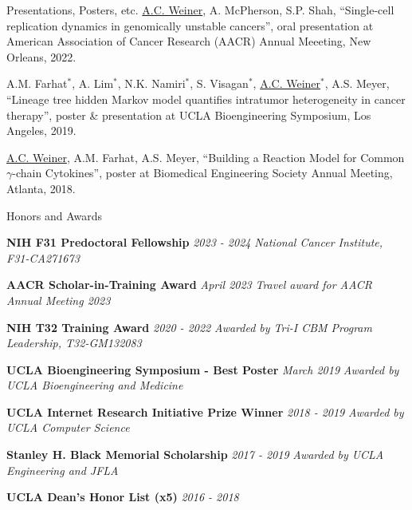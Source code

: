 \documentclass{resume} %
\begin{document}
\begin{rSection}{Presentations, Posters, etc.}
\underline{A.C. Weiner}, A. McPherson, S.P. Shah, ``Single-cell replication dynamics in genomically unstable cancers'', oral presentation at American Association of Cancer Research (AACR) Annual Meeeting, New Orleans, 2022.

A.M. Farhat$^{\ast}$, A. Lim$^{\ast}$, N.K. Namiri$^{\ast}$, S. Visagan$^{\ast}$, \underline{A.C. Weiner$^{\ast}$}, A.S. Meyer, ``Lineage tree hidden Markov model quantifies intratumor heterogeneity in cancer therapy'', poster \& presentation at UCLA Bioengineering Symposium, Los Angeles, 2019.

\underline{A.C. Weiner}, A.M. Farhat, A.S. Meyer, ``Building a Reaction Model for Common $\gamma$-chain Cytokines'', poster at Biomedical Engineering Society Annual Meeting, Atlanta, 2018.

\end{rSection}



\begin{rSection}{Honors and Awards}


\item \textbf{NIH F31 Predoctoral Fellowship} \hfill {\em 2023 - 2024}
\newline
\textit{National Cancer Institute, F31-CA271673}

\item \textbf{AACR Scholar-in-Training Award} \hfill {\em April 2023}
\newline
\textit{Travel award for AACR Annual Meeting 2023}

\item \textbf{NIH T32 Training Award} \hfill {\em2020 - 2022}
\newline
\textit{Awarded by Tri-I CBM Program Leadership, T32-GM132083}

\item \textbf{UCLA Bioengineering Symposium - Best Poster} \hfill {\em March 2019}
\newline
\textit{Awarded by UCLA Bioengineering and Medicine}

\item \textbf{UCLA Internet Research Initiative Prize Winner} \hfill {\em 2018 - 2019}
\newline
\textit{Awarded by UCLA Computer Science}

\item \textbf{Stanley H. Black Memorial Scholarship} \hfill {\em 2017 - 2019}
\newline
\textit{Awarded by UCLA Engineering and JFLA}

\item \textbf{UCLA Dean’s Honor List (x5)} \hfill {\em 2016 - 2018}

\end{rSection}
\end{document}
